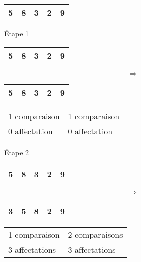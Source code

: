 \documentclass[10pt,fleqn]{article} %
\begin{document}
\begin{tabular}{|c|c|c|c|c|}
\hline
5 & 8 & 3 & 2 & 9 \\
\hline
\end{tabular}

\begin{minipage}[b]{.1\linewidth}
Étape 1 
\end{minipage}\hfill
\begin{minipage}[b]{.2\linewidth}
\begin{tabular}{|c|c|c|c|c|}
\hline
\cellcolor{black!10}5 & \cellcolor{black!30}8 & 3 & 2 & 9 \\
\hline
\end{tabular}
\end{minipage}\hfill
\begin{minipage}[b]{.1\linewidth}
$$
\Longrightarrow
$$
\end{minipage}\hfill
\begin{minipage}[b]{.2\linewidth}
\begin{tabular}{|c|c|c|c|c|}
\hline
\cellcolor{black!10}5 & \cellcolor{black!30}8 & 3 & 2 & 9 \\
\hline
\end{tabular}
\end{minipage}\hfill
\begin{minipage}[b]{.2\linewidth}
\begin{tabular}{ll}
1 comparaison & 1 comparaison \\
0 affectation & 0 affectation \\
\end{tabular}
\end{minipage}


\begin{minipage}[b]{.1\linewidth}
Étape 2
\end{minipage}\hfill
\begin{minipage}[b]{.2\linewidth}
\begin{tabular}{|c|c|c|c|c|}
\hline
\cellcolor{black!10}5 & \cellcolor{black!10}8 & \cellcolor{black!30}3 & 2 & 9 \\
\hline
\end{tabular}
\end{minipage}\hfill
\begin{minipage}[b]{.1\linewidth}
$$
\Longrightarrow
$$
\end{minipage}\hfill
\begin{minipage}[b]{.2\linewidth}
\begin{tabular}{|c|c|c|c|c|}
\hline
\cellcolor{black!30} 3 & \cellcolor{black!10}5 & \cellcolor{black!10}8 & 2 & 9 \\
\hline
\end{tabular}
\end{minipage}\hfill
\begin{minipage}[b]{.2\linewidth}
\begin{tabular}{ll}
1 comparaison & 2 comparaisons \\
3 affectations & 3 affectations \\
\end{tabular}
\end{minipage}
\end{document}
